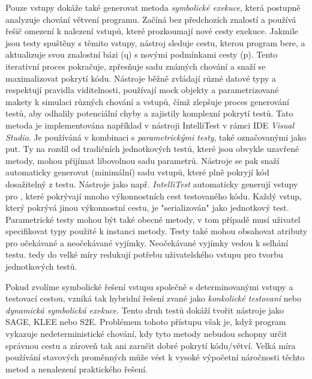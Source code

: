 \documentclass[12pt]{article}
\begin{document}
            Pouze vstupy dokáže také generovat metoda \textit{symbolické exekuce}, která postupně analyzuje chování větvení programu. Začíná bez předchozích znalostí a používá řešič omezení k nalezení vstupů, které prozkoumají nové cesty exekuce. Jakmile jsou testy spuštěny s těmito vstupy, nástroj sleduje cestu, kterou program bere, a aktualizuje svou znalostní bázi (q) s novými podmínkami cesty (p). Tento iterativní proces pokračuje, zpřesňuje sadu známých chování a snaží se maximalizovat pokrytí kódu. Nástroje běžně zvládají různé datové typy a respektují pravidla viditelnosti, používají mock objekty a parametrizované makety k simulaci různých chování a vstupů, čímž zlepšuje proces generování testů, aby odhalily potenciální chyby a zajistily komplexní pokrytí testů. \cite{parizek_symbolic_execution} Tato metoda je implementována například v nástroji IntelliTest v rámci IDE \textit{Visual Studio}. Je používáná v kombinaci s \emph{parametrickými testy}, také označovanými jako \acrshort{put}. Ty na rozdíl od tradičních jednotkových testů, které jsou obvykle uzavřené metody, mohou přijímat libovolnou sadu parametrů. Nástroje se pak snaží automaticky generovat (minimální) sadu vstupů, které plně pokryjí kód dosažitelný z testu. Nástroje jako např. \textit{IntelliTest} automaticky generují vstupy pro , které pokrývají mnoho výkonnostních cest testovaného kódu. Každý vstup, který pokrývá jinou výkonnostní cestu, je "serializován" jako jednotkový test. Parametrické testy mohou být také obecné metody, v tom případě musí uživatel specifikovat typy použité k instanci metody. Testy také mohou obsahovat atributy pro očekávané a neočekávané vyjímky. Neočekávané vyjímky vedou k selhání testu.  tedy do velké míry redukují potřebu uživatelského vstupu pro tvorbu jednotkových testů. \cite{IntelliTestInputGeneration2023} \cite{microsoft2023testgen}

            Pokud zvolíme symbolické řešení vstupu společně s determinovanými vstupy a testovací cestou, vzniká tak hybridní řešení zvané jako \emph{konkolické testovaní} nebo \emph{dynamická symbolická exekuce}. Tento druh testů dokáží tvořit nástroje jako SAGE, KLEE nebo S2E. Problémem tohoto přístupu však je, když program vykazuje nedeterministické chování, kdy tyto metody nebudou schopny určit správnou cestu a zároveň tak ani zaručit dobré pokrytí kódu/větví. Velká míra používání stavových proměnných může vést k vysoké výpočetní náročnosti těchto metod a nenalezení praktického řešení.  
\end{document}
